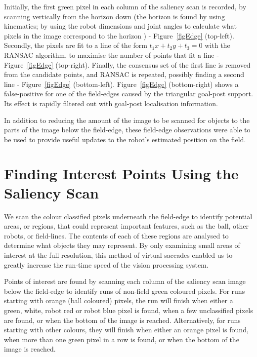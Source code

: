 \documentclass[runningheads,a4paper]{llncs}
\begin{document}
Initially, the first green pixel in each column of the saliency scan is
recorded, by scanning vertically from the horizon down (the horizon is found by
using kinematics; by using the robot dimensions and joint angles to calculate what pixels in the image correspond to the horizon \cite{cse10rUNSWift2010}) -
Figure~\ref{figEdge} (top-left). %
Secondly, the pixels are fit to a line of
the form $t_1x + t_2y + t_3 = 0$ with the RANSAC algorithm, to maximise the
number of points that fit a line - Figure~\ref{figEdge} (top-right). Finally,
the consensus set of the first line is removed from the candidate points, and
RANSAC is repeated, possibly finding a second line - Figure~\ref{figEdge}
(bottom-left). Figure~\ref{figEdge} (bottom-right) shows a false-positive for
one of the field-edges caused by the triangular goal-post support. Its effect is
rapidly filtered out with goal-post localisation information.

In addition to reducing the amount of the image to be scanned for objects to the
parts of the image below the field-edge, these field-edge observations were able
to be used to provide useful updates to the robot's estimated position on the
field.\cite{hengst10robocup}

\section{Finding Interest Points Using the Saliency Scan}

We scan the colour classified pixels underneath the field-edge to identify potential areas, or regions, that could represent important features, such as the ball, other robots, or field-lines. The contents of each of these regions are analysed to determine what objects they may represent. By only examining small areas of interest at the full resolution, this method of virtual saccades enabled us to greatly increase the run-time speed of the vision processing system.

Points of interest are found by scanning each column of the saliency scan image below the field-edge to identify runs of non-field green coloured pixels. For runs starting with orange (ball coloured) pixels, the run will finish when either a green, white, robot red or robot blue pixel is found, when a few unclassified pixels are found, or when the bottom of the image is reached. Alternatively, for runs starting with other colours, they will finish when either an orange pixel is found, when more than one green pixel in a row is found, or when the bottom of the image is reached. 
\end{document}
